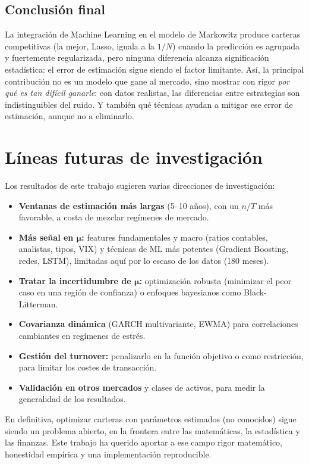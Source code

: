 \subsection{Conclusión final}

La integración de Machine Learning en el modelo de Markowitz produce carteras
competitivas (la mejor, Lasso, iguala a la $1/N$) cuando la predicción es
agrupada y fuertemente regularizada, pero ninguna diferencia alcanza
significación estadística: el error de estimación sigue siendo el factor
limitante. Así, la principal contribución no es un modelo que gane al mercado,
sino mostrar con rigor \textit{por qué es tan difícil ganarle}: con datos
realistas, las diferencias entre estrategias son indistinguibles del ruido. Y
también qué técnicas ayudan a mitigar ese error de estimación, aunque no a
eliminarlo.

\section{Líneas futuras de investigación}

Los resultados de este trabajo sugieren varias direcciones de investigación:

\begin{itemize}
    \item \textbf{Ventanas de estimación más largas} (5--10 años), con un
          $n/T$ más favorable, a costa de mezclar regímenes de mercado.
    \item \textbf{Más señal en $\boldsymbol{\mu}$:} features fundamentales y
          macro (ratios contables, analistas, tipos, VIX) y técnicas de ML más
          potentes (Gradient Boosting, redes, LSTM), limitadas aquí por lo
          escaso de los datos (180 meses).
    \item \textbf{Tratar la incertidumbre de $\boldsymbol{\mu}$:} optimización
          robusta (minimizar el peor caso en una región de confianza) o
          enfoques bayesianos como Black-Litterman.
    \item \textbf{Covarianza dinámica} (GARCH multivariante, EWMA) para
          correlaciones cambiantes en regímenes de estrés.
    \item \textbf{Gestión del turnover:} penalizarlo en la función objetivo o
          como restricción, para limitar los costes de transacción.
    \item \textbf{Validación en otros mercados} y clases de activos, para medir
          la generalidad de los resultados.
\end{itemize}

En definitiva, optimizar carteras con parámetros estimados (no conocidos) sigue
siendo un problema abierto, en la frontera entre las matemáticas, la estadística
y las finanzas. Este trabajo ha querido aportar a ese campo rigor matemático,
honestidad empírica y una implementación reproducible.
